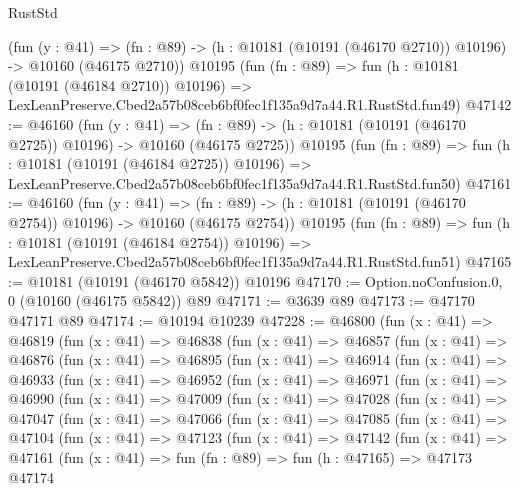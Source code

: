\begin{lexlean}{RustStd}
\begin{coremodule}
    (fun (y : @41) =>
    (fn : @89) -> (h : @10181 (@10191 (@46170 @2710)) @10196) -> @10160 (@46175 @2710))
    @10195
    (fun (fn : @89) =>
    fun (h : @10181 (@10191 (@46184 @2710)) @10196) =>
    LexLeanPreserve.Cbed2a57b08ceb6bf0fec1f135a9d7a44.R1.RustStd.fun49)
@47142 := @46160
    (fun (y : @41) =>
    (fn : @89) -> (h : @10181 (@10191 (@46170 @2725)) @10196) -> @10160 (@46175 @2725))
    @10195
    (fun (fn : @89) =>
    fun (h : @10181 (@10191 (@46184 @2725)) @10196) =>
    LexLeanPreserve.Cbed2a57b08ceb6bf0fec1f135a9d7a44.R1.RustStd.fun50)
@47161 := @46160
    (fun (y : @41) =>
    (fn : @89) -> (h : @10181 (@10191 (@46170 @2754)) @10196) -> @10160 (@46175 @2754))
    @10195
    (fun (fn : @89) =>
    fun (h : @10181 (@10191 (@46184 @2754)) @10196) =>
    LexLeanPreserve.Cbed2a57b08ceb6bf0fec1f135a9d7a44.R1.RustStd.fun51)
@47165 := @10181 (@10191 (@46170 @5842)) @10196
@47170 := Option.noConfusion.{0, 0} (@10160 (@46175 @5842)) @89
@47171 := @3639 @89
@47173 := @47170 @47171 @89
@47174 := @10194 @10239
@47228 := @46800
    (fun (x : @41) =>
    @46819
      (fun (x : @41) =>
      @46838
        (fun (x : @41) =>
        @46857
          (fun (x : @41) =>
          @46876
            (fun (x : @41) =>
            @46895
              (fun (x : @41) =>
              @46914
                (fun (x : @41) =>
                @46933
                  (fun (x : @41) =>
                  @46952
                    (fun (x : @41) =>
                    @46971
                      (fun (x : @41) =>
                      @46990
                        (fun (x : @41) =>
                        @47009
                          (fun (x : @41) =>
                          @47028
                            (fun (x : @41) =>
                            @47047
                              (fun (x : @41) =>
                              @47066
                                (fun (x : @41) =>
                                @47085
                                  (fun (x : @41) =>
                                  @47104
                                    (fun (x : @41) =>
                                    @47123
                                      (fun (x : @41) =>
                                      @47142
                                        (fun (x : @41) =>
                                        @47161
                                          (fun (x : @41) =>
                                          fun (fn : @89) =>
                                          fun (h : @47165) =>
                                          @47173
                                            @47174

\end{coremodule}
\end{lexlean}
